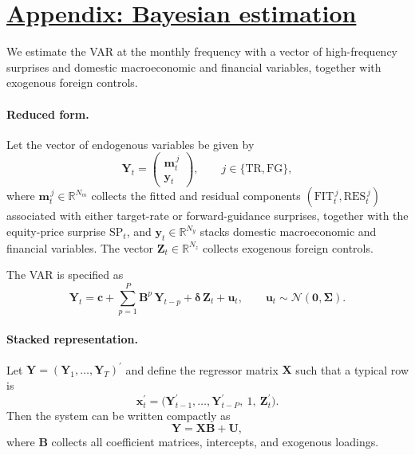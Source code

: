 \documentclass[\latexroot/\projectname]{subfiles}
\begin{document}
\FloatBarrier

\section{\href{https://econ-ark.github.io/HAFiscal/\#sec:appendix-hank}{Appendix: Bayesian estimation}}
\whenintegrated{\label{sec:appendix-hank}} %

We estimate the VAR at the monthly frequency with a vector of high-frequency surprises and domestic macroeconomic and financial variables, together with exogenous foreign controls.

\paragraph{Reduced form.}
Let the vector of endogenous variables be given by
\[
\boldsymbol{Y}_t =
\begin{pmatrix}
\boldsymbol{m}_t^{\,j} \\
\boldsymbol{y}_t
\end{pmatrix},
\qquad j \in \{\text{TR}, \text{FG}\},
\]
where $\boldsymbol{m}_t^{\,j} \in \mathbb{R}^{N_m}$ collects the fitted and residual components $(\text{FIT}_t^{\,j}, \text{RES}_t^{\,j})$ associated with either target-rate or forward-guidance surprises, together with the equity-price surprise $\text{SP}_t$, and $\boldsymbol{y}_t \in \mathbb{R}^{N_y}$ stacks domestic macroeconomic and financial variables. The vector $\boldsymbol{Z}_t \in \mathbb{R}^{N_z}$ collects exogenous foreign controls.

The VAR is specified as
\begin{equation}
\label{eq:A1_VAR}
\boldsymbol{Y}_t
=
\boldsymbol{c}
+ \sum_{p=1}^{P}
\boldsymbol{B}^{p}\,\boldsymbol{Y}_{t-p}
+ \boldsymbol{\delta}\,\boldsymbol{Z}_t
+ \boldsymbol{u}_t,
\qquad
\boldsymbol{u}_t \sim \mathcal{N}(\mathbf{0}, \boldsymbol{\Sigma}).
\end{equation}

\paragraph{Stacked representation.}
Let $\boldsymbol{Y} = (\boldsymbol{Y}_1,\dots,\boldsymbol{Y}_T)^\prime$ and define the regressor matrix $\boldsymbol{X}$ such that a typical row is
\[
\boldsymbol{x}_t^\prime =
\big(\boldsymbol{Y}_{t-1}^\prime,\ldots,\boldsymbol{Y}_{t-P}^\prime,\ 1,\ \boldsymbol{Z}_t^\prime\big).
\]
Then the system can be written compactly as
\[
\boldsymbol{Y} = \boldsymbol{X}\boldsymbol{B} + \boldsymbol{U},
\]
where $\boldsymbol{B}$ collects all coefficient matrices, intercepts, and exogenous loadings.
\end{document}
